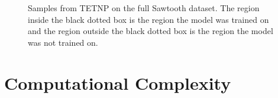 \documentclass[../../main.tex]{subfiles}
\begin{document}

\begin{figure}[H]
    \centering
    \\
    \\
    \caption{Samples from TETNP on the full Sawtooth dataset. The region inside the black dotted box is the region the model was trained on and the region outside the black dotted box is the region the model was not trained on.}
    \label{fig:full-saw-preds}
\end{figure}





\section{Computational Complexity}


\ifSubfilesClassLoaded{%
    \printbibliography{}
}{} 
\end{document}
